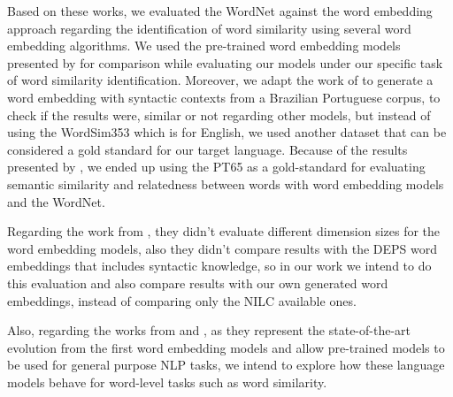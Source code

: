 Based on these works, we evaluated the WordNet against the word embedding approach regarding the identification of word similarity using several word embedding algorithms. 
We used the pre-trained word embedding models presented by  for comparison while evaluating our models under our specific task of word similarity identification.
Moreover, we adapt the work of  to generate a word embedding with syntactic contexts from a Brazilian Portuguese corpus, to check if the results were, similar or not regarding other models, but instead of using the WordSim353 which is for English, we used another dataset that can be considered a gold standard for our target language.
Because of the results presented by , we ended up using the PT65 as a gold-standard for evaluating semantic similarity and relatedness between words with word embedding models and the WordNet. 

Regarding the work from , they didn't evaluate different dimension sizes for the word embedding models, also they didn't compare results with the DEPS word embeddings that includes syntactic knowledge, so in our work we intend to do this evaluation and also compare results with our own generated word embeddings, instead of comparing only the NILC available ones.


Also, regarding the works from  and , as they represent the state-of-the-art evolution from the first word embedding models and allow pre-trained models to be used for general purpose NLP tasks, we intend to explore how these language models behave for word-level tasks such as word similarity.

% 




